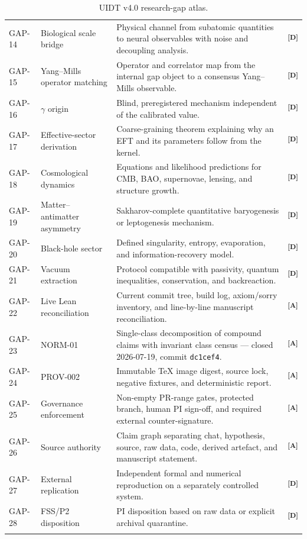 \documentclass[12pt,a4paper,twoside]{article}
\theoremstyle{plain}
\theoremstyle{definition}
\theoremstyle{remark}
\newcommand{\catmark}[1]{\textsuperscript{\textsf{\textbf{[#1]}}}}
\begin{document}
\begin{longtable}{@{}p{1.05cm}p{4.15cm}p{6.45cm}p{1.05cm}@{}}
GAP-14 & Biological scale bridge & Physical channel from subatomic quantities
to neural observables with noise and decoupling analysis. & \catmark{D}\\
GAP-15 & Yang--Mills operator matching & Operator and correlator map from the
internal gap object to a consensus Yang--Mills observable. & \catmark{D}\\
GAP-16 & $\gamma$ origin & Blind, preregistered mechanism independent of the
calibrated value. & \catmark{D}\\
GAP-17 & Effective-sector derivation & Coarse-graining theorem explaining why
an EFT and its parameters follow from the kernel. & \catmark{D}\\
GAP-18 & Cosmological dynamics & Equations and likelihood predictions for CMB,
BAO, supernovae, lensing, and structure growth. & \catmark{D}\\
GAP-19 & Matter--antimatter asymmetry & Sakharov-complete quantitative
baryogenesis or leptogenesis mechanism. & \catmark{D}\\
GAP-20 & Black-hole sector & Defined singularity, entropy, evaporation, and
information-recovery model. & \catmark{D}\\
GAP-21 & Vacuum extraction & Protocol compatible with passivity, quantum
inequalities, conservation, and backreaction. & \catmark{D}\\
GAP-22 & Live Lean reconciliation & Current commit tree, build log, axiom/sorry
inventory, and line-by-line manuscript reconciliation. & \catmark{A}\\
GAP-23 & NORM-01 & Single-class decomposition of compound claims with invariant
class census --- closed 2026-07-19, commit \texttt{dc1cef4}. & \catmark{A}\\
GAP-24 & PROV-002 & Immutable TeX image digest, source lock, negative fixtures,
and deterministic report. & \catmark{A}\\
GAP-25 & Governance enforcement & Non-empty PR-range gates, protected branch,
human PI sign-off, and required external counter-signature. & \catmark{A}\\
GAP-26 & Source authority & Claim graph separating chat, hypothesis, source,
raw data, code, derived artefact, and manuscript statement. & \catmark{A}\\
GAP-27 & External replication & Independent formal and numerical reproduction
on a separately controlled system. & \catmark{D}\\
GAP-28 & FSS/P2 disposition & PI disposition based on raw data or explicit
archival quarantine. & \catmark{D}\\
\bottomrule
\caption{UIDT v4.0 research-gap atlas.}
\label{tab:ctx-v4-gap-atlas}
\end{longtable}
\end{document}
